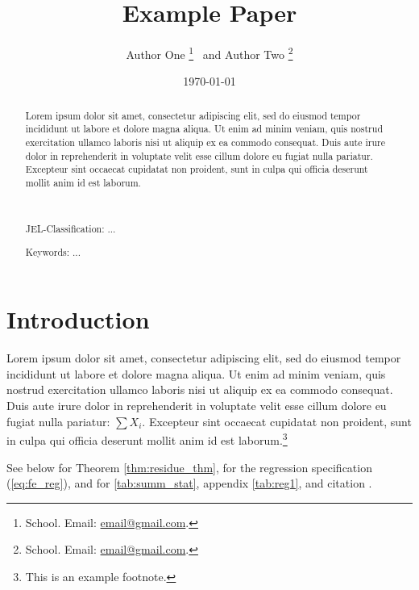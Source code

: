 \documentclass[12pt]{article}
\title{Example Paper}
\author{
    Author One%
    \thanks{School. Email: \href{mailto:email@gmail.com}{email@gmail.com}.} \ and Author Two%
    \thanks{School. Email: \href{mailto:email@gmail.com}{email@gmail.com}.}
}
\date{\today}
\begin{document}
\maketitle
\begin{abstract}
    Lorem ipsum dolor sit amet, consectetur adipiscing elit, sed do eiusmod tempor incididunt ut labore et dolore magna aliqua. Ut enim ad minim veniam, quis nostrud exercitation ullamco laboris nisi ut aliquip ex ea commodo consequat. Duis aute irure dolor in reprehenderit in voluptate velit esse cillum dolore eu fugiat nulla pariatur. Excepteur sint occaecat cupidatat non proident, sunt in culpa qui officia deserunt mollit anim id est laborum.

    \par~\par\noindent
    {\color{asher}JEL-Classification:} ...
    \par\noindent
    {\color{asher}Keywords:} ...
    \par\vspace{-2.5mm}
\end{abstract}

\newpage



\section{Introduction}

Lorem ipsum dolor sit amet, consectetur adipiscing elit, sed do eiusmod tempor incididunt ut labore et dolore magna aliqua. Ut enim ad minim veniam, quis nostrud exercitation ullamco laboris nisi ut aliquip ex ea commodo consequat. Duis aute irure dolor in reprehenderit in voluptate velit esse cillum dolore eu fugiat nulla pariatur: $\sum X_i$. Excepteur sint occaecat cupidatat non proident, sunt in culpa qui officia deserunt mollit anim id est laborum.\footnote{This is an example footnote.}

See below for Theorem \ref{thm:residue_thm}, for the regression specification (\ref{eq:fe_reg}), and for \autoref{tab:summ_stat}, appendix \autoref{tab:reg1}, and citation \citet{Eigen1971}.

\end{document}
